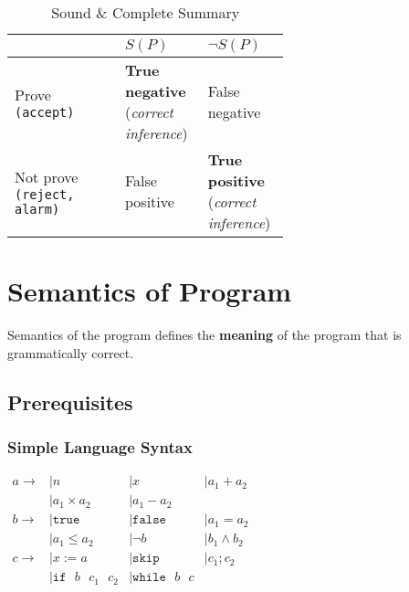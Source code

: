 \begin{table}[ht]
  \centering
  \caption{Sound \& Complete Summary}
  \label{tab:summary}

  \begin{tabular}[t]{l>{\raggedright}p{0.3\linewidth}>{\raggedright\arraybackslash}p{0.3\linewidth}}
    \hline
    & $ S(P) $ & $ \neg S(P) $ \\
    \hline
    Prove \texttt{(accept)} & \textbf{True negative} (\textsl{correct inference}) & False negative \\
    Not prove \texttt{(reject, alarm)} & False positive & \textbf{True positive} (\textsl{correct inference}) \\
    \hline
  \end{tabular}
\end{table}%



\section{Semantics of Program}
\label{sec:semantics}

Semantics of the program defines the \textbf{meaning} of the program
that is grammatically correct.

\subsection{Prerequisites}

\subsubsection{Simple Language Syntax}

\begin{math}
  \begin{array}{llll}
    a \to & \mid n & \mid x & \mid a_1 + a_2 \\
          & \mid a_1 \times a_2 & \mid a_1 - a_2 \\
    b \to & \mid \mathtt{true} & \mid \mathtt{false} & \mid a_1 = a_2  \\
          & \mid a_1 \leq a_2 & \mid \neg b & \mid b_1 \land b_2 \\
    c \to & \mid x := a  & \mid \mathtt{skip} & \mid c_1 ; c_2 \\
          & \mid \mathtt{if} \text{ }b \text{ }c_1\text{ }c_2 & \mid \mathtt{while} \text{ }b \text{ }c \\
  \end{array}
\end{math}

